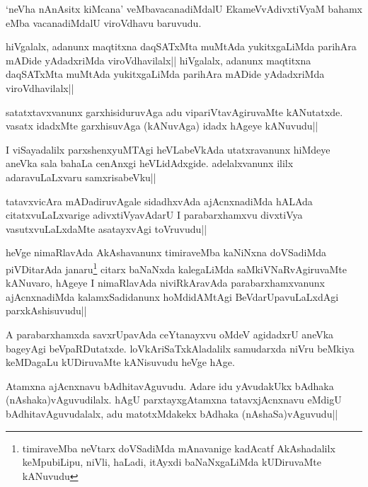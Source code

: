 \begin{artha}
`neVha nAnAsitx kiMcana' veMbavacanadiMdalU EkameVvAdivxtiVyaM bahamx eMba vacanadiMdalU viroVdhavu baruvudu.
\end{artha}

\begin{artha}
hiVgalalx, adanunx maqtitxna daqSATxMta muMtAda yukitxgaLiMda parihAra mADide yAdadxriMda viroVdhavilalx||
hiVgalalx, adanunx maqtitxna daqSATxMta muMtAda yukitxgaLiMda parihAra mADide yAdadxriMda viroVdhavilalx||
\end{artha}

\begin{artha}
satatxtavxvanunx garxhisiduruvAga adu vipariVtavAgiruvaMte kANutatxde.  vasatx idadxMte garxhisuvAga (kANuvAga) idadx hAgeye kANuvudu||
\end{artha}

\begin{artha}
I viSayadalilx parxshenxyuMTAgi heVLabeVkAda utatxravanunx hiMdeye aneVka sala bahaLa cenAnxgi heVLidAdxgide. adelalxvanunx ililx adaravuLaLxvaru samxrisabeVku||
\end{artha}


\begin{artha}%
tatavxvicAra mADadiruvAgale sidadhxvAda ajAcnxnadiMda hALAda citatxvuLaLxvarige adivxtiVyavAdarU I parabarxhamxvu divxtiVya vasutxvuLaLxdaMte asatayxvAgi toVruvudu||

heVge nimaRlavAda AkAshavanunx timiraveMba kaNiNxna doVSadiMda piVDitarAda janaru\footnote[1]{timiraveMba neVtarx doVSadiMda mAnavanige kadAcatf AkAshadalilx keMpubiLipu, niVli, haLadi, itAyxdi baNaNxgaLiMda kUDiruvaMte kANuvudu} citarx baNaNxda kalegaLiMda saMkiVNaRvAgiruvaMte kANuvaro, hAgeye I nimaRlavAda niviRkAravAda parabarxhamxvanunx ajAcnxnadiMda kalamxSadidanunx hoMdidAMtAgi BeVdarUpavuLaLxdAgi parxkAshisuvudu||
\end{artha}

\begin{artha}
A parabarxhamxda savxrUpavAda ceYtanayxvu oMdeV agidadxrU aneVka bageyAgi beVpaRDutatxde. loVkAriSaTxkAladalilx samudarxda niVru beMkiya keMDagaLu kUDiruvaMte kANisuvudu heVge hAge.
\end{artha}


\begin{artha}
Atamxna ajAcnxnavu bAdhitavAguvudu. Adare idu yAvudakUkx bAdhaka (nAshaka)vAguvudilalx. hAgU parxtayxgAtamxna tatavxjAcnxnavu eMdigU bAdhitavAguvudalalx, adu matotxMdakekx bAdhaka (nAshaSa)vAguvudu||
\end{artha}

